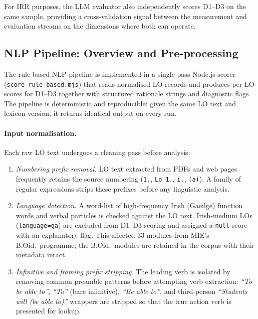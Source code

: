 \documentclass[12pt, a4paper]{article}
\begin{document}
For IRR purposes, the LLM evaluator also independently scores D1--D3 on the same
sample, providing a cross-validation signal between the measurement and evaluation
streams on the dimensions where both can operate.

\subsection{NLP Pipeline: Overview and Pre-processing}
\label{sec:nlp-pipeline}

The rule-based NLP pipeline is implemented in a single-pass Node.js scorer
(\texttt{score-rule-based.mjs}) that reads normalised LO records and produces
per-LO scores for D1--D3 together with structured rationale strings and diagnostic
flags. The pipeline is deterministic and reproducible: given the same LO text and
lexicon version, it returns identical output on every run.

\paragraph{Input normalisation.}
Each raw LO text undergoes a cleaning pass before analysis:

\begin{enumerate}
  \item \textit{Numbering prefix removal.} LO text extracted from PDFs and web pages
    frequently retains the source numbering (\texttt{1.}, \texttt{Lo 1.}, \texttt{i.},
    \texttt{(a)}). A family of regular expressions strips these prefixes before
    any linguistic analysis.
  \item \textit{Language detection.} A word-list of high-frequency Irish (Gaeilge)
    function words and verbal particles is checked against the LO text.
    Irish-medium LOs (\texttt{language=ga}) are excluded from D1--D3 scoring and
    assigned a \texttt{null} score with an explanatory flag. This affected 33 modules
    from MIE's B.Oid.\ programme; the B.Oid.\ modules are retained in the corpus
    with their metadata intact.
  \item \textit{Infinitive and framing prefix stripping.}
    The leading verb is isolated by removing common preamble patterns before
    attempting verb extraction: \textit{``To be able to''}, \textit{``To''} (bare
    infinitive), \textit{``Be able to''}, and third-person
    \textit{``Students will (be able to)''} wrappers are stripped so that the true
    action verb is presented for lookup.
\end{enumerate}
\end{document}
